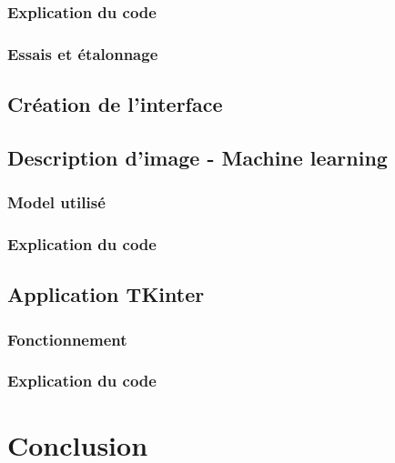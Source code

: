 	\subsubsection{Explication du code}
	
	\subsubsection{Essais et étalonnage}
	
\subsection{Création de l'interface}

\clearpage	
\subsection{Description d'image - Machine learning}

\subsubsection{Model utilisé}

\subsubsection{Explication du code}

\clearpage	
\subsection{Application TKinter}

\subsubsection{Fonctionnement}

\subsubsection{Explication du code}

\clearpage
\section{Conclusion}

